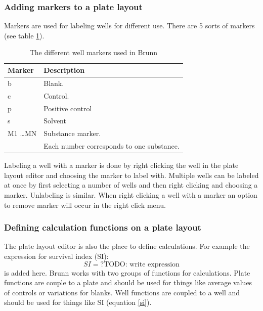 \documentclass[a4paper,10pt]{article}
\begin{document}
            \subsubsection{Adding markers to a plate layout}
                Markers are used for labeling wells for different use. There
                are 5 sorts of markers (see table \ref{markersTable}).

                \begin{table}
                    \begin{center}
                        \begin{tabular}{l|l}
                            Marker & Description \\
                            \hline
                            b & Blank.           \\
                            c & Control.         \\
                            p & Positive control \\
                            s & Solvent          \\
                            M1 \ldots MN & Substance marker. \\ 
                                         & Each number corresponds to
                                           one substance. \\
                        \end{tabular}
                    \end{center}
                    \caption{The different well markers used in Brunn}
                    \label{markersTable}
                \end{table}
                
                Labeling a well with a marker is done by right clicking the
                well in the plate layout editor and choosing the marker to
                label with. Multiple wells can be labeled at once by first
                selecting a number of wells and then right clicking and
                choosing a marker. Unlabeling is similar. When right clicking a
                well with a marker an option to remove marker will occur in the
                right click menu.

            \subsubsection{Defining calculation functions on a plate layout}
                The plate layout editor is also the place to define
                calculations. For example the expression for survival index
                (SI):
                \begin{equation} SI = ? \mbox{TODO: write expression}
                \label{si} \end{equation}
                is added here. Brunn works with two groups of functions for
                calculations. Plate functions are couple to a plate and should
                be used for things like average values of controls or
                variations for blanks. Well functions are coupled to a well and
                should be used for things like SI (equation \ref{si}).
                
\end{document}
